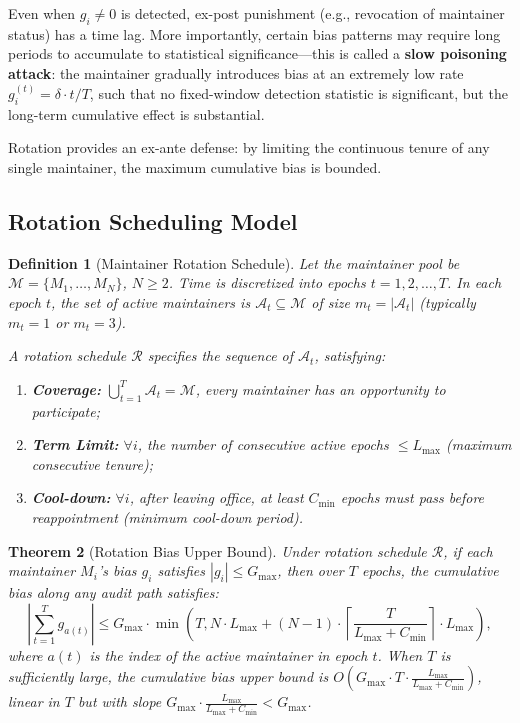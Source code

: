 \documentclass[11pt,a4paper]{article}
\newtheorem{theorem}{Theorem}[section]
\newtheorem{definition}[theorem]{Definition}
\theoremstyle{definition}
\begin{document}
\noindent
Even when $g_i \neq 0$ is detected, ex-post punishment (e.g., revocation of maintainer status) has a time lag. More importantly, certain bias patterns may require long periods to accumulate to statistical significance---this is called a \textbf{slow poisoning attack}: the maintainer gradually introduces bias at an extremely low rate $g_i^{(t)} = \delta \cdot t/T$, such that no fixed-window detection statistic is significant, but the long-term cumulative effect is substantial.

Rotation provides an ex-ante defense: by limiting the continuous tenure of any single maintainer, the maximum cumulative bias is bounded.

\subsection{Rotation Scheduling Model}

\begin{definition}[Maintainer Rotation Schedule]
\label{def:rotation_schedule}
Let the maintainer pool be $\mathcal{M} = \{M_1, \ldots, M_N\}$, $N \geq 2$. Time is discretized into epochs $t = 1, 2, \ldots, T$. In each epoch $t$, the set of active maintainers is $\mathcal{A}_t \subseteq \mathcal{M}$ of size $m_t = |\mathcal{A}_t|$ (typically $m_t = 1$ or $m_t = 3$).

A rotation schedule $\mathcal{R}$ specifies the sequence of $\mathcal{A}_t$, satisfying:
\begin{enumerate}[label=(C\arabic*), leftmargin=*]
    \item \textbf{Coverage:} $\bigcup_{t=1}^{T} \mathcal{A}_t = \mathcal{M}$, every maintainer has an opportunity to participate;
    \item \textbf{Term Limit:} $\forall i$, the number of consecutive active epochs $\leq L_{\max}$ (maximum consecutive tenure);
    \item \textbf{Cool-down:} $\forall i$, after leaving office, at least $C_{\min}$ epochs must pass before reappointment (minimum cool-down period).
\end{enumerate}
\end{definition}

\begin{theorem}[Rotation Bias Upper Bound]
\label{thm:rotation_bound}
Under rotation schedule $\mathcal{R}$, if each maintainer $M_i$'s bias $g_i$ satisfies $|g_i| \leq G_{\max}$, then over $T$ epochs, the cumulative bias along any audit path satisfies:
\begin{equation}\label{eq:rotation_cum_bias}
    \left|\sum_{t=1}^{T} g_{a(t)}\right| \leq G_{\max} \cdot \min\left(T, N \cdot L_{\max} + (N-1) \cdot \left\lceil\frac{T}{L_{\max} + C_{\min}}\right\rceil \cdot L_{\max}\right),
\end{equation}
where $a(t)$ is the index of the active maintainer in epoch $t$.
When $T$ is sufficiently large, the cumulative bias upper bound is $O(G_{\max} \cdot T \cdot \frac{L_{\max}}{L_{\max} + C_{\min}})$, linear in $T$ but with slope $G_{\max} \cdot \frac{L_{\max}}{L_{\max} + C_{\min}} < G_{\max}$.
\end{theorem}
\end{document}
